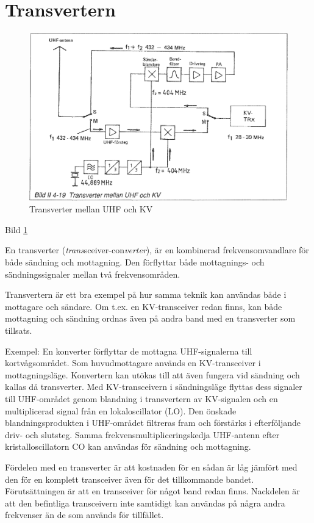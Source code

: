 \section{Transvertern}

\begin{figure}
  \includegraphics[width=\textwidth]{images/bild_2_4-19}
  \caption{Transverter mellan UHF och KV}
  \label{fig:bildII4-19}
\end{figure}

Bild \ref{fig:bildII4-19}

En transverter (\emph{trans}sceiver-con\emph{verter}), är en
kombinerad frekvensomvandlare för både sändning och mottagning. Den
förflyttar både mottagnings- och sändningssignaler mellan två
frekvensområden.

Transvertern är ett bra exempel på hur samma teknik kan användas både
i mottagare och sändare. Om t.ex. en KV-transceiver redan finns, kan
både mottagning och sändning ordnas även på andra band med en
transverter som tillsats.

Exempel: En konverter förflyttar de mottagna UHF-signalerna till
kortvågsområdet. Som huvudmottagare används en KV-transceiver i
mottagningsläge. Konvertern kan utökas till att även fungera vid
sändning och kallas då transverter. Med KV-transceivern i
sändningsläge flyttas dess signaler till UHF-området genom blandning
i transvertern av KV-signalen och en multiplicerad signal från en
lokaloscillator (LO). Den önskade blandningsprodukten i
UHF-området filtreras fram och förstärks i efterföljande driv- och
slutsteg. Samma frekvensmultipliceringskedja UHF-antenn efter
kristalloscillatorn CO kan användas för sändning och mottagning.

Fördelen med en transverter är att kostnaden för en sådan är låg
jämfört med den för en komplett transceiver även för det tillkommande
bandet. Förutsättningen är att en transceiver för något band redan
finns.  Nackdelen är att den befintliga transceivern inte samtidigt
kan användas på några andra frekvenser än de som används för
tillfället.
